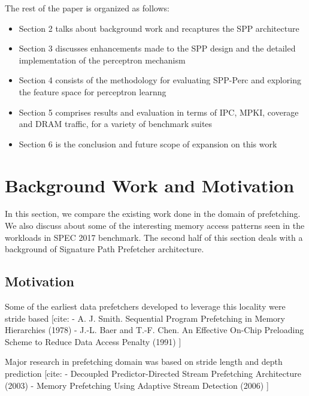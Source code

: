 \documentclass{sig-alternate}
\begin{document}
\vspace{1ex}The rest of the paper is organized as follows:

\begin{itemize}
\item Section 2 talks about background work and recaptures the SPP architecture
\item Section 3 discusses enhancements made to the SPP design and the detailed implementation of the perceptron mechanism
\item Section 4 consists of the methodology for evaluating SPP-Perc and exploring the feature space for perceptron learnng
\item Section 5 comprises results and evaluation in terms of IPC, MPKI, coverage and DRAM traffic, for a variety of benchmark suites
\item Section 6 is the conclusion and future scope of expansion on this work
\end{itemize}

\section{Background Work and Motivation}

In this section, we compare the existing work done in the domain of prefetching. We also discuss about some of the interesting memory access patterns seen in the workloads in SPEC 2017 benchmark. The second half of this section deals with a background of Signature Path Prefetcher architecture.

\subsection{Motivation}
Some of the earliest data prefetchers developed to leverage this locality were stride based [cite:\newline
- A. J. Smith. Sequential Program Prefetching in Memory Hierarchies (1978)\newline
- J.-L. Baer and T.-F. Chen. An Effective On-Chip Preloading Scheme to Reduce Data Access Penalty (1991)\newline
]\newline

Major research in prefetching domain was based on stride length and depth prediction [cite:\newline
- Decoupled Predictor-Directed Stream Prefetching
Architecture (2003)\newline
- Memory Prefetching Using Adaptive Stream Detection (2006)\newline
]\newline
\end{document}
